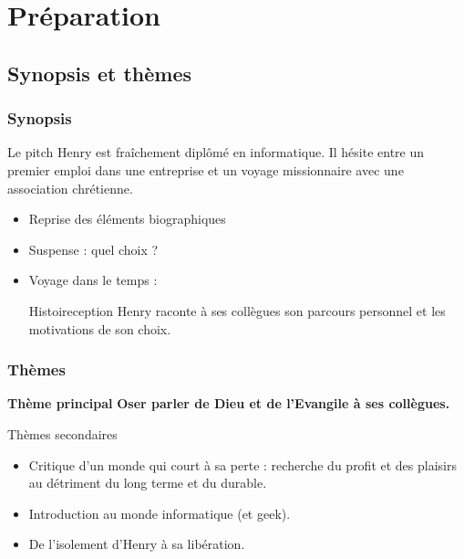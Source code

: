 \section{Préparation}

\begin{frame}
\sectionFrame{}
\end{frame}

	\subsection{Synopsis et thèmes}

	\begin{frame}
	\frametitle{Synopsis}
	
		\begin{block}{Le pitch}
		Henry est fraîchement diplômé en informatique.
		Il hésite entre un premier emploi dans une entreprise
		et un voyage missionnaire avec une association
		chrétienne.
		\end{block}
		
		\begin{itemize}
		\item Reprise des éléments biographiques
		\item Suspense : quel choix ?
		\item Voyage dans le temps :
            \begin{block}{Histoireception}
            Henry raconte à ses collègues son parcours personnel
            et les motivations de son choix.
            \end{block}
		\end{itemize}
		
	\end{frame}
	
	\begin{frame}
	\frametitle{Thèmes}
	
		\begin{block}{\textbf{Thème principal}}
		{\bfseries Oser parler de Dieu et de l'Evangile à ses collègues.}
		\end{block}
		
		\begin{block}{Thèmes secondaires}
			\begin{itemize}
			\item Critique d'un monde qui court à sa perte : recherche du 
			profit et des plaisirs au détriment du long terme et du durable.
			\item Introduction au monde informatique (et geek).
			\item De l'isolement d'Henry à sa libération.
			\end{itemize}
		\end{block}
		
	\end{frame}

